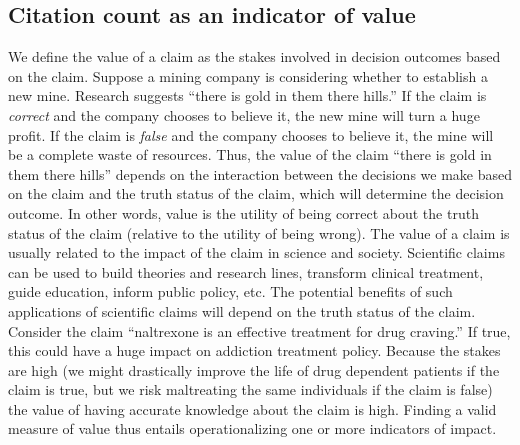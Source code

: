 \documentclass[
  english,
  man,floatsintext]{apa6}
\begin{document}
\hypertarget{citation-count-as-an-indicator-of-value}{%
\subsection{Citation count as an indicator of value}\label{citation-count-as-an-indicator-of-value}}

We define the value of a claim as the stakes involved in decision outcomes based on the claim. Suppose a mining company is considering whether to establish a new mine. Research suggests ``there is gold in them there hills.'' If the claim is \emph{correct} and the company chooses to believe it, the new mine will turn a huge profit. If the claim is \emph{false} and the company chooses to believe it, the mine will be a complete waste of resources. Thus, the value of the claim ``there is gold in them there hills'' depends on the interaction between the decisions we make based on the claim and the truth status of the claim, which will determine the decision outcome. In other words, value is the utility of being correct about the truth status of the claim (relative to the utility of being wrong). The value of a claim is usually related to the impact of the claim in science and society. Scientific claims can be used to build theories and research lines, transform clinical treatment, guide education, inform public policy, etc. The potential benefits of such applications of scientific claims will depend on the truth status of the claim. Consider the claim ``naltrexone is an effective treatment for drug craving.'' If true, this could have a huge impact on addiction treatment policy. Because the stakes are high (we might drastically improve the life of drug dependent patients if the claim is true, but we risk maltreating the same individuals if the claim is false) the value of having accurate knowledge about the claim is high. Finding a valid measure of value thus entails operationalizing one or more indicators of impact.
\end{document}

